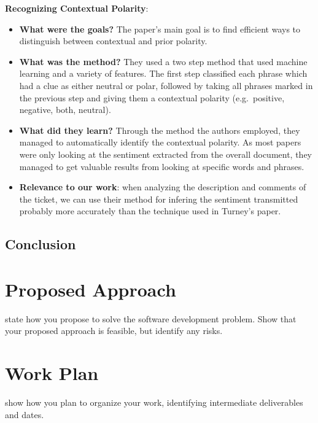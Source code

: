 \documentclass{mprop}
\begin{document}
\textbf{Recognizing Contextual Polarity}\cite{wilson2005recognizing}:
\begin{itemize}
  \item \textbf{What were the goals?}
    The paper's main goal is to find efficient ways to distinguish between 
    contextual and prior polarity.
  \item \textbf{What was the method?}
    They used a two step method that used machine learning and a variety of
    features. The first step classified each phrase which had a clue as either
    neutral or polar, followed by taking all phrases marked in the previous step
    and giving them a contextual polarity (e.g.\ positive, negative, 
    both, neutral).
  \item \textbf{What did they learn?}
    Through the method the authors employed, they managed to automatically 
    identify the contextual polarity. As most papers were only looking at the 
    sentiment extracted from the overall document, they managed to get valuable 
    results from looking at specific words and phrases.
  \item \textbf{Relevance to our work}: when analyzing the description and
    comments of the ticket, we can use their method for infering the sentiment 
    transmitted probably more accurately than the technique used in 
    Turney's paper\cite{turney2002thumbs}.
\end{itemize}

\subsection{Conclusion}

\section{Proposed Approach}

state how you propose to solve the software development problem. Show that your proposed approach is feasible, but identify any risks.

\section{Work Plan}

show how you plan to organize your work, identifying intermediate deliverables and dates.



\end{document}

